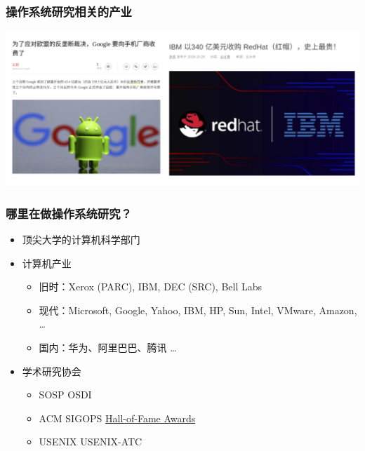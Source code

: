 \begin{frame}
    \frametitle{操作系统研究相关的产业}
     \includegraphics[width=1.0\linewidth]{companies-os}
\end{frame}

    
\begin{frame}
    \frametitle{哪里在做操作系统研究？}
    \begin{itemize}
        \item 顶尖大学的计算机科学部门
        \item 计算机产业
        \begin{itemize}
            \item 旧时：Xerox (PARC), IBM, DEC (SRC), Bell Labs
            \item 现代：Microsoft, Google, Yahoo, IBM, HP, Sun, Intel, VMware, Amazon,  …
            \item 国内：华为、阿里巴巴、腾讯 …
        \end{itemize}

        \item 学术研究协会
        \begin{itemize}
            \item SOSP OSDI
            \item ACM SIGOPS \href{http://www.sigops.org/award-hof.html}{Hall-of-Fame Awards} 
            \item USENIX USENIX-ATC
        \end{itemize}
    \end{itemize}
\end{frame}




